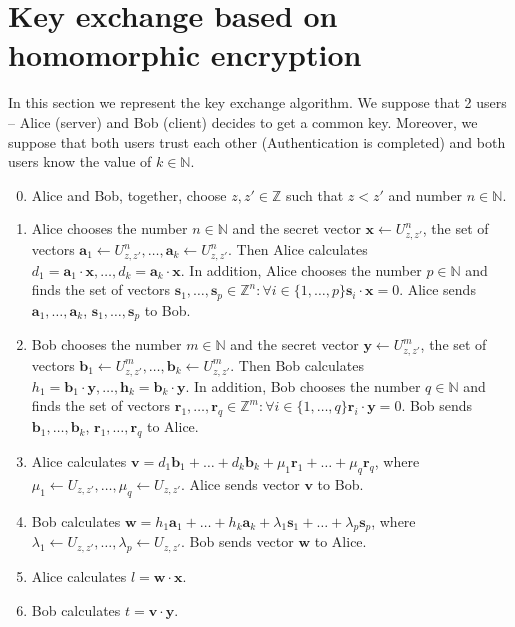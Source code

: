 \section{Key exchange based on homomorphic encryption}
	In this section we represent the key exchange algorithm. We suppose that 2 users -- Alice (server) and Bob (client) decides to get a common key. Moreover, we suppose that both users trust each other (Authentication is completed) and both users know the value of $ k \in \mathbb{N} $. 
	\begin{enumerate}
		\setcounter{enumi}{-1}
		\item Alice and Bob, together, choose $ z, z' \in \mathbb{Z} $ such that $ z < z' $ and number $ n \in \mathbb{N} $.
		\item Alice chooses the number $ n \in \mathbb{N} $ and the secret vector $ \textbf{x} \leftarrow U_{z, z'}^n $, the set of vectors $ \textbf{a}_1 \leftarrow U_{z, z'}^n, \dots, \textbf{a}_k \leftarrow U_{z, z'}^n $. Then Alice calculates $ d_1 = \textbf{a}_1 \cdot \textbf{x}, \dots, d_k = \textbf{a}_k \cdot \textbf{x} $. In addition, Alice chooses the number $ p \in \mathbb{N} $ and finds the set of vectors $ \textbf{s}_1, \dots, \textbf{s}_p \in \mathbb{Z}^n : \forall i \in \{1, \dots, p\} \textbf{s}_i \cdot \textbf{x} = 0 $. Alice sends $ \textbf{a}_1, \dots, \textbf{a}_k $, $ \textbf{s}_1, \dots, \textbf{s}_p $ to Bob.
		\item Bob chooses the number $ m \in \mathbb{N} $ and the secret vector $ \textbf{y} \leftarrow U_{z, z'}^m $, the set of vectors $ \textbf{b}_1 \leftarrow U_{z, z'}^m, \dots, \textbf{b}_k \leftarrow U_{z, z'}^m $. Then Bob calculates $ h_1 = \textbf{b}_1 \cdot \textbf{y}, \dots, \textbf{h}_k = \textbf{b}_k \cdot \textbf{y} $. In addition, Bob chooses the number $ q \in \mathbb{N} $ and finds the set of vectors $ \textbf{r}_1, \dots, \textbf{r}_q \in \mathbb{Z}^m : \forall i \in \{1, \dots, q\} \textbf{r}_i \cdot \textbf{y} = 0 $. Bob sends $ \textbf{b}_1, \dots, \textbf{b}_k $, $ \textbf{r}_1, \dots, \textbf{r}_q $ to Alice.
		\item Alice calculates $ \textbf{v} = d_1 \textbf{b}_1 + \dots + d_k \textbf{b}_k + \mu_1 \textbf{r}_1 + \dots + \mu_q \textbf{r}_q $, where $ \mu_1 \leftarrow U_{z, z'}, \dots, \mu_q \leftarrow U_{z, z'} $. Alice sends vector $ \textbf{v} $ to Bob.
		\item Bob calculates $ \textbf{w} = h_1 \textbf{a}_1 + \dots + h_k \textbf{a}_k + \lambda_1 \textbf{s}_1 + \dots + \lambda_p \textbf{s}_p $, where $ \lambda_1 \leftarrow U_{z, z'}, \dots, \lambda_p \leftarrow U_{z, z'}$. Bob sends vector $ \textbf{w} $ to Alice.
		\item Alice calculates $ l = \textbf{w} \cdot \textbf{x} $.
		\item Bob calculates $ t = \textbf{v} \cdot \textbf{y} $.
	\end{enumerate}
